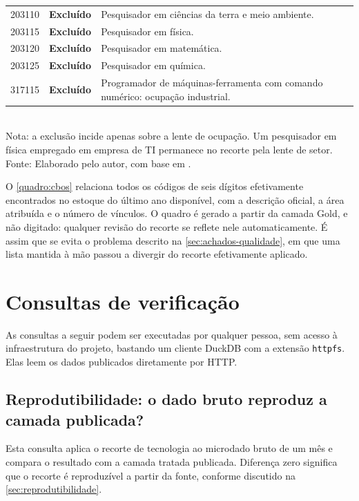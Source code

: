 \begin{apendicesenv}
\begin{quadro}[H]
\begin{tabular}{llp{7.6cm}}
        \midrule
        203110 & \textbf{Excluído} & Pesquisador em ciências da terra e meio ambiente. \\
        203115 & \textbf{Excluído} & Pesquisador em física. \\
        203120 & \textbf{Excluído} & Pesquisador em matemática. \\
        203125 & \textbf{Excluído} & Pesquisador em química. \\
        317115 & \textbf{Excluído} & Programador de máquinas-ferramenta com comando numérico: ocupação industrial. \\
        \bottomrule
    \end{tabular}
    \\[4pt]
    Nota: a exclusão incide apenas sobre a lente de ocupação. Um pesquisador em física
    empregado em empresa de TI permanece no recorte pela lente de setor. \\
    {\footnotesize Fonte: Elaborado pelo autor, com base em .}
\end{quadro}

O \autoref{quadro:cbos} relaciona todos os códigos de seis dígitos efetivamente encontrados no estoque do último ano disponível, com a descrição oficial, a área atribuída e o número de vínculos. O quadro é gerado a partir da camada Gold, e não digitado: qualquer revisão do recorte se reflete nele automaticamente. É assim que se evita o problema descrito na \autoref{sec:achados-qualidade}, em que uma lista mantida à mão passou a divergir do recorte efetivamente aplicado.



\chapter{Consultas de verificação}
\label{apend:consultas}

As consultas a seguir podem ser executadas por qualquer pessoa, sem acesso à infraestrutura do projeto, bastando um cliente DuckDB com a extensão \texttt{httpfs}. Elas leem os dados publicados diretamente por HTTP.

\section{Reprodutibilidade: o dado bruto reproduz a camada publicada?}

Esta consulta aplica o recorte de tecnologia ao microdado bruto de um mês e compara o resultado com a camada tratada publicada. Diferença zero significa que o recorte é reproduzível a partir da fonte, conforme discutido na \autoref{sec:reprodutibilidade}.


\end{apendicesenv}
